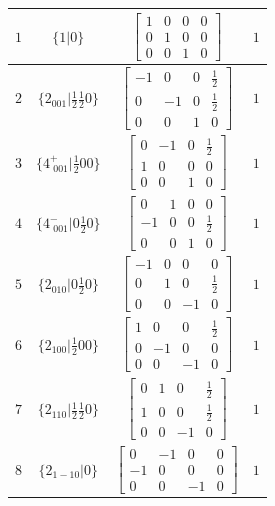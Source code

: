 \documentclass[fleqn,8pt]{jsarticle}
\begin{document}
\begin{longtable}{cccc}
$ 1 $ & $ \{1|0\} $ & $ \begin{bmatrix} 1 & 0 & 0 & 0 \\ 0 & 1 & 0 & 0 \\ 0 & 0 & 1 & 0 \end{bmatrix} $ & $ 1 $ \\ \hline
$ 2 $ & $ \{2{}_{001}|\frac{1}{2} \frac{1}{2} 0\} $ & $ \begin{bmatrix} -1 & 0 & 0 & \frac{1}{2} \\ 0 & -1 & 0 & \frac{1}{2} \\ 0 & 0 & 1 & 0 \end{bmatrix} $ & $ 1 $ \\ \hline
$ 3 $ & $ \{4^{+}_{\,\,001}|\frac{1}{2} 0 0\} $ & $ \begin{bmatrix} 0 & -1 & 0 & \frac{1}{2} \\ 1 & 0 & 0 & 0 \\ 0 & 0 & 1 & 0 \end{bmatrix} $ & $ 1 $ \\ \hline
$ 4 $ & $ \{4^{-}_{\,\,001}|0 \frac{1}{2} 0\} $ & $ \begin{bmatrix} 0 & 1 & 0 & 0 \\ -1 & 0 & 0 & \frac{1}{2} \\ 0 & 0 & 1 & 0 \end{bmatrix} $ & $ 1 $ \\ \hline
$ 5 $ & $ \{2{}_{010}|0 \frac{1}{2} 0\} $ & $ \begin{bmatrix} -1 & 0 & 0 & 0 \\ 0 & 1 & 0 & \frac{1}{2} \\ 0 & 0 & -1 & 0 \end{bmatrix} $ & $ 1 $ \\ \hline
$ 6 $ & $ \{2{}_{100}|\frac{1}{2} 0 0\} $ & $ \begin{bmatrix} 1 & 0 & 0 & \frac{1}{2} \\ 0 & -1 & 0 & 0 \\ 0 & 0 & -1 & 0 \end{bmatrix} $ & $ 1 $ \\ \hline
$ 7 $ & $ \{2{}_{110}|\frac{1}{2} \frac{1}{2} 0\} $ & $ \begin{bmatrix} 0 & 1 & 0 & \frac{1}{2} \\ 1 & 0 & 0 & \frac{1}{2} \\ 0 & 0 & -1 & 0 \end{bmatrix} $ & $ 1 $ \\ \hline
$ 8 $ & $ \{2{}_{1-10}|0\} $ & $ \begin{bmatrix} 0 & -1 & 0 & 0 \\ -1 & 0 & 0 & 0 \\ 0 & 0 & -1 & 0 \end{bmatrix} $ & $ 1 $ \\ \hline

\end{longtable}
\end{document}

